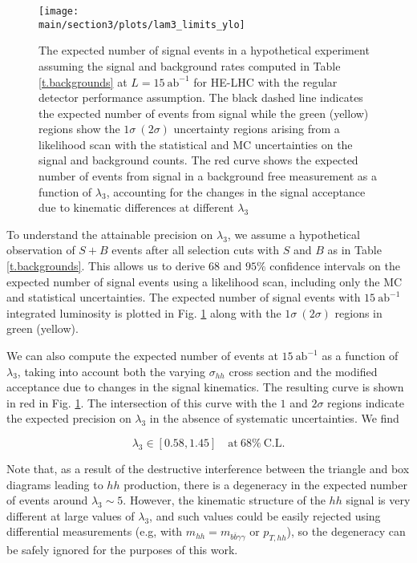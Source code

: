 \begin{figure}
	\centering
	\texttt{[image: \\main/section3/plots/lam3\_limits\_ylo]}
	\caption{The expected number of signal events in a hypothetical experiment assuming the signal and background rates computed in Table \ref{t.backgrounds} at $L = 15~\text{ab}^{-1}$ for HE-LHC with the regular detector performance assumption. The black dashed line indicates the expected number of events from signal while the green (yellow) regions show the $1\sigma~(2\sigma)$ uncertainty regions arising from a likelihood scan with the statistical and MC uncertainties on the signal and background counts. The red curve shows the expected number of events from signal in a background free measurement as a function of $\lambda_3$, accounting for the changes in the signal acceptance due to kinematic differences at different $\lambda_3$}\label{fig:lam3_limit}
\end{figure}

To understand the attainable precision on $\lambda_{3}$, we assume a hypothetical observation of $S+B$ events after all selection cuts with $S$ and $B$ as in Table \ref{t.backgrounds}. This allows us to derive $68$ and $95\%$ confidence intervals on the expected number of signal events using a likelihood scan, including only the MC and statistical uncertainties. The expected number of signal events with $15~\text{ab}^{-1}$ integrated luminosity is plotted in Fig. \ref{fig:lam3_limit} along with the $1\sigma~(2\sigma)$ regions in green (yellow).

We can also compute the expected number of events at $15~\text{ab}^{-1}$ as a function of $\lambda_{3}$, taking into account both the varying $\sigma_{hh}$ cross section and the modified acceptance due to changes in the signal kinematics. The resulting curve is shown in red in Fig. \ref{fig:lam3_limit}. The intersection of this curve with the $1$ and $2\sigma$ regions indicate the expected precision on $\lambda_3$ in the absence of systematic uncertainties. We find

\begin{equation}
\lambda_{3} \in \left[ 0.58 ,  1.45 \right] \quad \text{at}~ 68\%~\text{C.L.}
\end{equation}

Note that, as a result of the destructive interference between the triangle and box diagrams leading to $hh$ production, there is a degeneracy in the expected number of events around $\lambda_3 \sim 5$. However, the kinematic structure of the $hh$ signal is very different at large values of $\lambda_3$, and such values could be easily rejected using differential measurements (e.g, with $m_{hh} = m_{b\bar{b}\gamma\gamma}$ or $p_{T,hh}$), so the degeneracy can be safely ignored for the purposes of this work.

